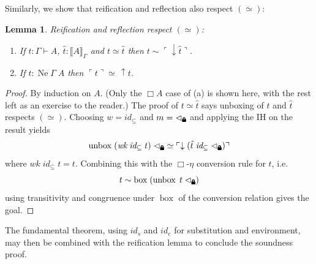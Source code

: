 \documentclass[12pt,twoside,openright]{report}
\numberwithin{equation}{chapter}
\numberwithin{figure}{chapter}
\numberwithin{table}{chapter}
\newtheorem{lemma}[theorem]{Lemma}
\theoremstyle{definition}\newtheorem{definition}{Definition}
\newcommand{\lock}{\text{\tikz[baseline]{
      \fill[rounded corners=.1ex] (-.75ex,0) rectangle (.75ex,1ex);
      \draw[line width=.3ex] (-.4ex,.5ex) -- ++(0,.75ex) arc (180:0:.4ex) -- ++(0,-.75ex);
}}}
\begin{document}
Similarly, we show that reification and reflection also respect $(\simeq)$:
\begin{lemma}
  Reification and reflection respect $(\simeq)$:
  \begin{enumerate}
    \renewcommand{\theenumi}{\alph{enumi}}
  \item If $t : \Gamma \vdash A$, $\hat t : \llbracket A \rrbracket_\Gamma$
    and $t \simeq \hat t$ then $t \sim \ulcorner \downarrow\hat t \urcorner$.
  \item If $t : \operatorname{Ne} \Gamma \; A$ then $\ulcorner t \urcorner \simeq \, \uparrow t$.
  \end{enumerate}
\end{lemma}
\begin{proof}
  By induction on $A$.
  (Only the $\Box A$ case of (a) is shown here,
  with the rest left as an exercise to the reader.)
  The proof of $t \simeq \hat t$ says unboxing of $t$ and $\hat t$ respects $(\simeq)$.
  Choosing $w = \textit{id}_\subseteq$ and $m = \lhd_\lock$
  and applying the IH on the result yields
  $$ \operatorname{unbox} \; (\textit{wk} \; \textit{id}_\subseteq \; t) \; \lhd_\lock \simeq \ulcorner \downarrow (\hat t \; \textit{id}_\subseteq \; \lhd_\lock) \urcorner $$
  where $\textit{wk} \; \textit{id}_\subseteq \; t = t$.
  Combining this with the $\Box\text{-}\eta$ conversion rule for $t$, i.e.
  $$ t \sim \operatorname{box} \; (\operatorname{unbox} \; t \; \lhd_\lock) $$
  using transitivity and congruence under $\operatorname{box}$
  of the conversion relation gives the goal.
\end{proof}

The fundamental theorem,
using $\textit{id}_s$ and $\textit{id}_e$ for substitution and environment,
may then be combined with the reification lemma
to conclude the soundness proof.
\end{document}

